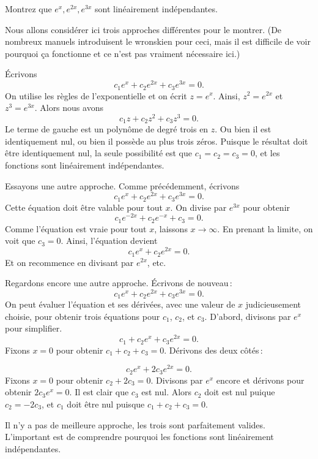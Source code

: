 \begin{example}
Montrez que $e^x, e^{2x}, e^{3x}$ sont linéairement indépendantes.

Nous allons considérer ici trois approches différentes pour le montrer.
(De nombreux manuels introduisent le wronskien pour ceci, mais il est difficile de voir pourquoi ça fonctionne et
ce n'est pas vraiment nécessaire ici.)

Écrivons
\begin{equation*}
c_1 e^x + c_2 e^{2x} + c_3 e^{3x} = 0.
\end{equation*}
On utilise les règles de l'exponentielle et on écrit $z = e^x$.  Ainsi, $z^2 = e^{2x}$
et $z^3 = e^{3x}$.  Alors nous avons
\begin{equation*}
c_1 z + c_2 z^2 + c_3 z^3 = 0.
\end{equation*}
Le terme de gauche est un polynôme de degré trois en $z$.
Ou bien il est identiquement nul, ou bien il possède au plus trois zéros. Puisque le résultat doit être identiquement nul, la seule possibilité est que 
$c_1 = c_2 = c_3 = 0$, et les fonctions sont linéairement indépendantes. 

Essayons une autre approche. Comme précédemment, écrivons 
\begin{equation*}
c_1 e^x + c_2 e^{2x} + c_3 e^{3x} = 0.
\end{equation*}
Cette équation doit être valable pour tout $x$.  On divise par  $e^{3x}$ pour obtenir
\begin{equation*}
c_1 e^{-2x} + c_2 e^{-x} + c_3 = 0.
\end{equation*}
Comme l'équation est vraie pour tout $x$, laissons $x \to \infty$.  En prenant la limite, on voit que $c_3 = 0$.  Ainsi, l'équation devient 
\begin{equation*}
c_1 e^x + c_2 e^{2x} = 0.
\end{equation*}
Et on recommence en divisant par $e^{2x}$, etc.

Regardons encore une autre approche. Écrivons de nouveau\,:  
\begin{equation*}
c_1 e^x + c_2 e^{2x} + c_3 e^{3x} = 0.
\end{equation*}
On peut évaluer l'équation et ses dérivées, avec une valeur de $x$ judicieusement choisie, pour obtenir trois équations pour 
$c_1$, $c_2$, et $c_3$.
D'abord, divisons par $e^{x}$ pour simplifier.
\begin{equation*}
c_1 + c_2 e^{x} + c_3 e^{2x} = 0.
\end{equation*}
Fixons $x=0$ pour obtenir $c_1 + c_2 + c_3 = 0$.  Dérivons des deux côtés\,: 

\begin{equation*}
c_2 e^{x} + 2 c_3 e^{2x} = 0 .
\end{equation*}
Fixons  $x=0$ pour obtenir $c_2 + 2c_3 = 0$.  Divisons par $e^x$ encore et dérivons pour obtenir 
$2 c_3 e^{x} = 0$.  Il est clair que   $c_3$ est nul.  Alors $c_2$ doit est nul puique $c_2 = -2c_3$, et $c_1$ doit être nul puisque $c_1 + c_2 + c_3 = 0$.

Il n'y a pas de meilleure approche, les trois sont parfaitement valides. L'important est de comprendre pourquoi les fonctions sont linéairement indépendantes. 
\end{example}

